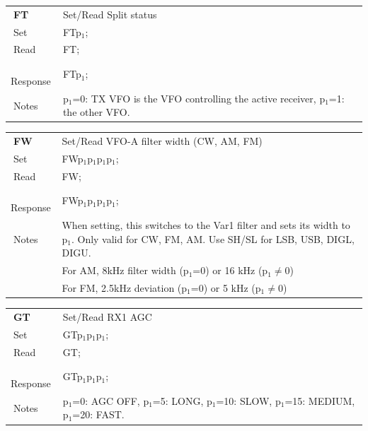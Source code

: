 \documentclass[12pt]{book}
\begin{document}
\begin{center}
\begin{tabular}{|p{2cm}|p{11cm}|}
\toprule
$\phantom{\Big|}$\textbf{\large FT} & Set/Read Split status \\\cline{1-2}
$\phantom{\Big|}${\large Set} & {FTp$_1$;} \\\hline
$\phantom{\Big|}${\large Read} & {FT;} \\\hline
$\phantom{\Big|}${\large Response} & {FTp$_1$;} \\\hline
$\phantom{\Big|}${\large Notes} & \multicolumn{1}{|p{11cm}|}{p$_1$=0: TX VFO is the VFO controlling the active receiver, p$_1$=1: the other VFO.} \\
\bottomrule
\end{tabular}
\end{center}

\begin{center}
\begin{tabular}{|p{2cm}|p{11cm}|}
\toprule
$\phantom{\Big|}$\textbf{\large FW} & Set/Read VFO-A filter width (CW, AM, FM) \\\cline{1-2}
$\phantom{\Big|}${\large Set} & {FWp$_1$p$_1$p$_1$p$_1$;} \\\hline
$\phantom{\Big|}${\large Read} & {FW;} \\\hline
$\phantom{\Big|}${\large Response} & {FWp$_1$p$_1$p$_1$p$_1$;} \\\hline
$\phantom{\Big|}${\large Notes} & \multicolumn{1}{|p{11cm}|}{When setting, this switches to the Var1 filter and sets its  width to p$_1$. Only valid for CW, FM, AM. Use SH/SL for LSB, USB, DIGL, DIGU.} \\
 & \multicolumn{1}{|p{11cm}|}{For AM, 8kHz filter width (p$_1$=0) or  16 kHz (p$_1$$\ne$0)} \\
 & \multicolumn{1}{|p{11cm}|}{For FM, 2.5kHz deviation (p$_1$=0) or 5 kHz (p$_1$$\ne$0)} \\
\bottomrule
\end{tabular}
\end{center}

\begin{center}
\begin{tabular}{|p{2cm}|p{11cm}|}
\toprule
$\phantom{\Big|}$\textbf{\large GT} & Set/Read RX1 AGC \\\cline{1-2}
$\phantom{\Big|}${\large Set} & {GTp$_1$p$_1$p$_1$;} \\\hline
$\phantom{\Big|}${\large Read} & {GT;} \\\hline
$\phantom{\Big|}${\large Response} & {GTp$_1$p$_1$p$_1$;} \\\hline
$\phantom{\Big|}${\large Notes} & \multicolumn{1}{|p{11cm}|}{p$_1$=0: AGC OFF, p$_1$=5: LONG, p$_1$=10: SLOW, p$_1$=15: MEDIUM, p$_1$=20: FAST.} \\
\bottomrule
\end{tabular}
\end{center}
\end{document}
